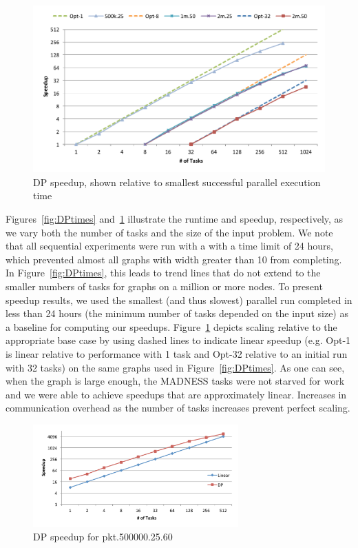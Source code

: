 \documentclass[conference]{IEEEtran}
\begin{document}
\begin{figure}[!ht]
\includegraphics[angle=0,width=6in]{figures/fig10_col.pdf}
\caption{DP speedup, shown relative to smallest successful parallel execution time}
\label{fig:DPspeedup}
\end{figure}

Figures~\ref{fig:DPtimes} and~\ref{fig:DPspeedup} illustrate the runtime and speedup, respectively, as we vary both the number of tasks and the size of the input problem. We note that all sequential experiments were run with a
with a time limit of 24 hours, which prevented almost all graphs with width greater than 10 from completing. In Figure~\ref{fig:DPtimes}, this leads to trend lines that do not extend to the smaller numbers of tasks for graphs on a
million or more nodes.  To present speedup results, we used the smallest (and thus slowest) parallel run completed in less than 24 hours (the minimum number of tasks depended on the input size) as a baseline for computing our speedups. Figure~\ref{fig:DPspeedup} depicts scaling relative to the appropriate base case by using dashed lines to indicate linear speedup (e.g. Opt-1 is linear relative to performance with 1 task and Opt-32 relative to an initial run with 32 tasks) on the same graphs used in Figure~\ref{fig:DPtimes}. As one can see, when the graph is large enough, the MADNESS tasks were not starved for work and we were able to achieve speedups that are approximately linear.  Increases in communication overhead as the number of tasks increases prevent perfect scaling.

\begin{figure}[!ht]
\includegraphics[angle=0,width=3.1in]{figures/fig11_col.pdf}
\caption{DP speedup for pkt.500000.25.60}
\label{fig:500k.25.seq.sp}
\end{figure}
\end{document}
